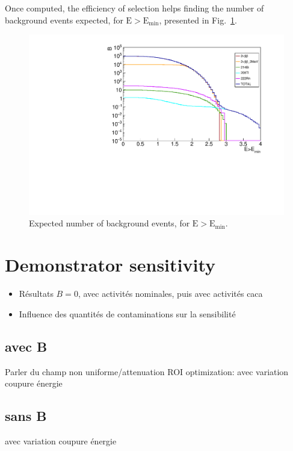 Once computed, the efficiency of selection helps finding the number of background events expected, for $\text{E}>\text{E}_{\text{min}}$, presented in Fig.~\ref{fig:sensitivity_Nbkg_spectra}.
\begin{figure}[h]
  \centering
  \includegraphics[width=1.1\textwidth]{Sensitivity/fig_sensitivity/Nbackground_spectrum_with_B_82Se.pdf}
  \caption{Expected number of background events, for $\text{E}>\text{E}_{\text{min}}$.
    \label{fig:sensitivity_Nbkg_spectra}}
\end{figure}


\section{Demonstrator sensitivity}

\begin{itemize}
\item Résultats $B=0$, avec activités nominales, puis avec activités caca
\item Influence des quantités de contaminations sur la sensibilité
\end{itemize}

\subsection{avec B}
Parler du champ non uniforme/attenuation
ROI optimization: avec variation coupure énergie\\

\subsection{sans B}
avec variation coupure énergie\\

